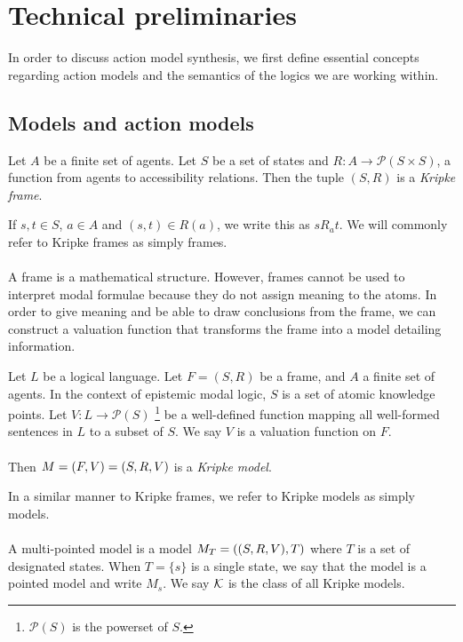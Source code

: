 \chapter{Technical preliminaries} \label{chapter:prelim}
In order to discuss action model synthesis, we first define essential concepts
regarding action
models and the semantics of the logics we are working within.

\section{Models and action models} \label{subsec:prelim:models}

\begin{defn} \label{frame}
	Let $A$ be a finite set of agents.
	Let $S$ be a set of states and $R: A \to \mathcal{P}(S \times S)$, a function from agents to
	accessibility relations.
	Then the tuple $(S, R)$ is a {\em Kripke frame}.
\end{defn}

If $s, t \in S$, $a \in A$ and $(s,t) \in R(a)$, we write this as $s R_a t$.
We will commonly refer to Kripke frames as simply frames.\\
\\
A frame is a mathematical structure.
However, frames cannot be used to interpret modal formulae because they do not assign meaning to the
atoms.
In order to give meaning and be able to draw conclusions from the frame, we can
construct a valuation function that transforms the frame into a model detailing
information.

\begin{defn} \label{model}
	Let $L$ be a logical language.
	Let $F = (S, R)$ be a frame, and $A$ a finite set of agents.
	In the context of epistemic modal logic, $S$ is a set of atomic knowledge points.
	Let $V: L \to \mathcal{P}(S)$ \footnote{$\mathcal{P}(S)$ is the powerset of $S$.} be a
	well-defined function mapping all well-formed	sentences in $L$ to a subset of $S$.
	We say $V$ is a valuation function on $F$.\\
	\\
	Then $M = (F, V) = (S, R, V)$ is a {\em Kripke model}.
\end{defn}

In a similar manner to Kripke frames, we refer to Kripke models as simply models.\\
\\
A multi-pointed model is a model $M_T = ((S, R, V), T)$ where $T$ is a set of designated states.
When $T = \{s\}$ is a single state, we say that the model is a pointed model and write $M_s$.
We say $\mathcal{K}$ is the class of all Kripke models.

